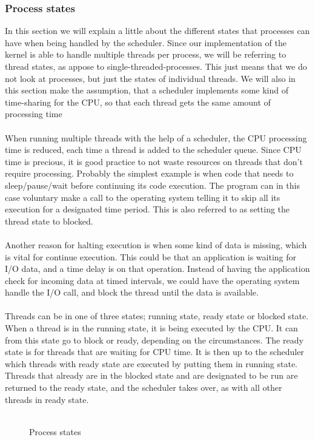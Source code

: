 \subsubsection{Process states}
In this section we will explain a little about the different states that processes can have when being handled by the scheduler. Since our implementation of the kernel is able to handle multiple threads per process, we will be referring to thread states, as appose to single-threaded-processes. This just means that we do not look at processes, but just the states of individual threads. We will also in this section make the assumption, that a scheduler implements some kind of time-sharing for the CPU, so that each thread gets the same amount of processing time
\\
\\
When running multiple threads with the help of a scheduler, the CPU processing time is reduced, each time a thread is added to the scheduler queue. Since CPU time is precious, it is good practice to not waste resources on threads that don't require processing. Probably the simplest example is when code that needs to sleep/pause/wait before continuing its code execution. The program can in this case voluntary make a call to the operating system telling it to skip all its execution for a designated time period. This is also referred to as setting the thread state to blocked.
\\
\\
Another reason for halting execution is when some kind of data is missing, which is vital for continue execution. This could be that an application is waiting for I/O data, and a time delay is on that operation. Instead of having the application check for incoming data at timed intervals, we could have the operating system handle the I/O call, and block the thread until the data is available.
\\
\\
Threads can be in one of three states; running state, ready state or blocked state. 
When a thread is in the running state, it is being executed by the CPU. It can from this state go to block or ready, depending on the circumstances. The ready state is for threads that are waiting for CPU time. It is then up to the scheduler which threads with ready state are executed by putting them in running state. Threads that already are in the blocked state and are designated to be run are returned to the ready state, and the scheduler takes over, as with all other threads in ready state.
\\
\\
\begin{figure}
\centering
{}
\caption{Process states}
\label{fig:process_states}
\end{figure}

